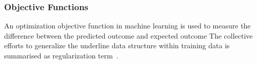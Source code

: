\subsubsection{Objective Functions}
An optimization objective function in machine learning is used to measure the difference between the predicted outcome and expected outcome The collective efforts to generalize the underline data structure within training data is summarised as regularization term~\cite{goodfellow_2015}.  